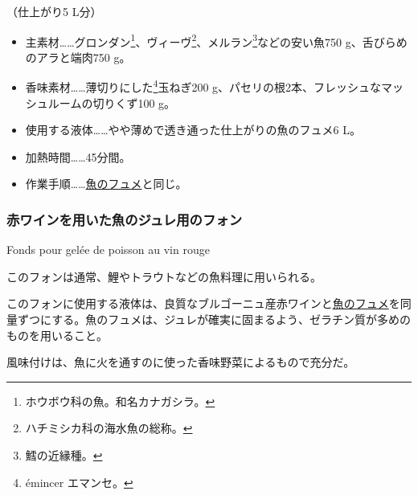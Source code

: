 \begin{recette}
（仕上がり5 L分）

\begin{itemize}
\item
  主素材\ldots{}\ldots{}グロンダン\footnote{ホウボウ科の魚。和名カナガシラ。}、ヴィーヴ\footnote{ハチミシカ科の海水魚の総称。}、メルラン\footnote{鱈の近縁種。}などの安い魚750
  g、舌びらめのアラと端肉750 g。
\item
  香味素材\ldots{}\ldots{}薄切りにした\footnote{émincer エマンセ。}玉ねぎ200
  g、パセリの根2本、フレッシュなマッシュルームの切りくず100 g。
\item
  使用する液体\ldots{}\ldots{}やや薄めで透き通った仕上がりの魚のフュメ6
  L。
\item
  加熱時間\ldots{}\ldots{}45分間。
\item
  作業手順\ldots{}\ldots{}\protect\hyperlink{fumet-de-poisson}{魚のフュメ}と同じ。
\end{itemize}

\atoaki{}

\hypertarget{fonds-pour-gelee-de-poisson-au-vin-rouge}{%
\subsubsection{赤ワインを用いた魚のジュレ用のフォン}\label{fonds-pour-gelee-de-poisson-au-vin-rouge}}

\begin{frsubenv}

Fonds pour gelée de poisson au vin rouge

\end{frsubenv}


このフォンは通常、鯉やトラウトなどの魚料理に用いられる。

このフォンに使用する液体は、良質なブルゴーニュ産赤ワインと\protect\hyperlink{fumet-de-poisson}{魚のフュメ}を同量ずつにする。魚のフュメは、ジュレが確実に固まるよう、ゼラチン質が多めのものを用いること。

風味付けは、魚に火を通すのに使った香味野菜によるもので充分だ。

\atoaki{}

\hypertarget{observation-sur-l-emplois-des-fonds-destines-aux-gelees}{%
}
\end{recette}
